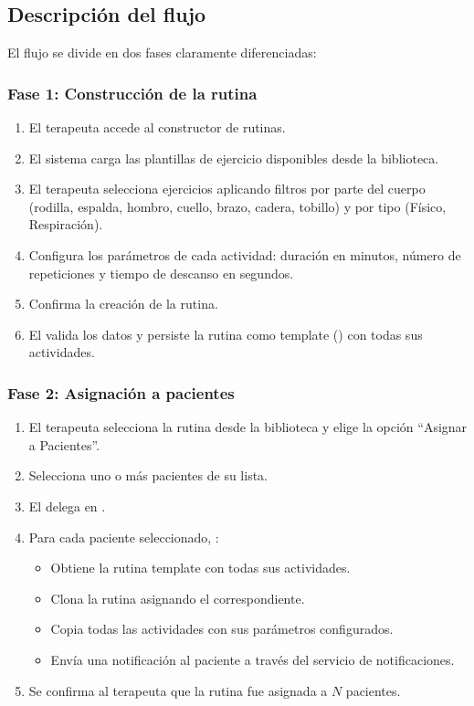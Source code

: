 \subsection{Descripción del flujo}

El flujo se divide en dos fases claramente diferenciadas:

\subsubsection{Fase 1: Construcción de la rutina}

\begin{enumerate}
  \item El terapeuta accede al constructor de rutinas.
  \item El sistema carga las plantillas de ejercicio disponibles desde la biblioteca.
  \item El terapeuta selecciona ejercicios aplicando filtros por parte del cuerpo (rodilla, espalda, hombro, cuello, brazo, cadera, tobillo) y por tipo (Físico, Respiración).
  \item Configura los parámetros de cada actividad: duración en minutos, número de repeticiones y tiempo de descanso en segundos.
  \item Confirma la creación de la rutina.
  \item El  valida los datos y persiste la rutina como template () con todas sus actividades.
\end{enumerate}

\subsubsection{Fase 2: Asignación a pacientes}

\begin{enumerate}
  \item El terapeuta selecciona la rutina desde la biblioteca y elige la opción ``Asignar a Pacientes''.
  \item Selecciona uno o más pacientes de su lista.
  \item El  delega en .
  \item Para cada paciente seleccionado, :
  \begin{itemize}
    \item Obtiene la rutina template con todas sus actividades.
    \item Clona la rutina asignando el  correspondiente.
    \item Copia todas las actividades con sus parámetros configurados.
    \item Envía una notificación al paciente a través del servicio de notificaciones.
  \end{itemize}
  \item Se confirma al terapeuta que la rutina fue asignada a $N$ pacientes.
\end{enumerate}

